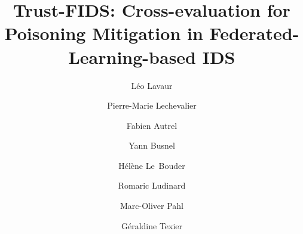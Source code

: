 \documentclass[runningheads]{llncs}
\theoremstyle{definition}
\theoremstyle{definition}
\begin{document}
\title{Trust-FIDS: Cross-evaluation for Poisoning Mitigation in Federated-Learning-based IDS
}

\author{
     Léo Lavaur%
\and Pierre-Marie Lechevalier%
\and Fabien Autrel%
\and Yann Busnel%
\and Hélène Le~Bouder%
\and Romaric Ludinard%
\and Marc-Oliver Pahl%
\and Géraldine Texier%
}



\end{document}
